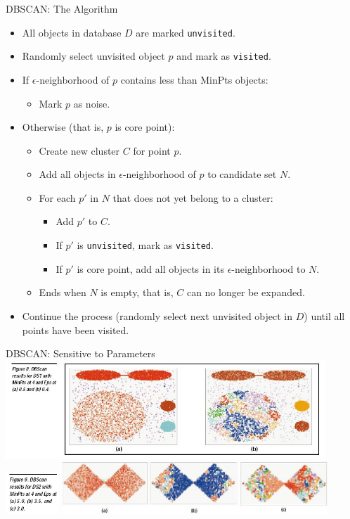 \begin{frame}{DBSCAN: The Algorithm}
	\begin{itemize}
		\item All objects in database $D$ are marked \texttt{unvisited}.
		\item Randomly select unvisited object $p$ and mark as \texttt{visited}.
		\item If $\epsilon$-neighborhood of $p$ contains less than MinPts 
		objects:
		\begin{itemize}
			\item Mark $p$ as noise.
		\end{itemize}
		\item Otherwise (that is, $p$ is core point):
		\begin{itemize}
			\item Create new cluster $C$ for point $p$.
			\item Add all objects in $\epsilon$-neighborhood of $p$ to 
			candidate set $N$.
			\item For each $p'$ in $N$ that does not yet belong to a cluster:
			\begin{itemize}
				\item Add $p'$ to $C$.
				\item If $p'$ is \texttt{unvisited}, mark as \texttt{visited}.
				\item If $p'$ is core point, add all objects in its 
				$\epsilon$-neighborhood to $N$.
			\end{itemize}
			\item Ends when $N$ is empty, that is, $C$ can no longer be 
			expanded.
		\end{itemize}
		\item Continue the process (randomly select next unvisited object in 
		$D$) until all points have been visited.
	\end{itemize}
\end{frame}

\begin{frame}{DBSCAN: Sensitive to Parameters}
	\centering
	\includegraphics[width=12cm]{img/dbscan.png}\\
	\includegraphics[width=2cm]{img/dbscan3.png}
	\includegraphics[width=10cm]{img/dbscan2.png}
\end{frame}

